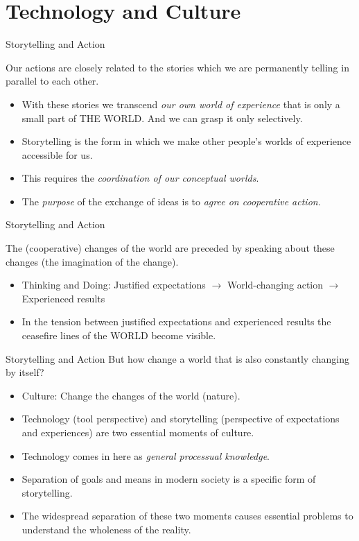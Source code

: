 \documentclass{beamer}
\title{Modelling Sustainable Systems\\ and Semantic Web\\[6pt] Information and
  Language \vskip1em}
\subtitle{Lecture in the Module 10-202-2309\\ for Master Computer Science}
\author{Prof. Dr. Hans-Gert Gräbe\\
\url{http://www.informatik.uni-leipzig.de/~graebe}}
\date{July 2021}
\begin{document}
{
\begin{frame}
  \titlepage
\end{frame}}

\section{Technology and Culture}
\begin{frame}{Storytelling and Action}
  
Our actions are closely related to the stories which we are permanently
telling in parallel to each other.
\begin{itemize}
\item With these stories we transcend \emph{our own world of experience} that
  is only a small part of THE WORLD. And we can grasp it only selectively.
\item Storytelling is the form in which we make other people's worlds of
  experience accessible for us.
\item This requires the \emph{coordination of our conceptual worlds}.
\item The \emph{purpose} of the exchange of ideas is to \emph{agree on
  cooperative action}.
\end{itemize}
\end{frame}
\begin{frame}{Storytelling and Action}

The (cooperative) changes of the world are preceded by speaking about these
changes (the imagination of the change).
\begin{itemize}
\item Thinking and Doing: Justified expectations $\to$ World-changing action
  $\to$ Experienced results
\item In the tension between justified expectations and experienced results
  the ceasefire lines of the WORLD become visible.
\end{itemize}
\end{frame}

\begin{frame}{Storytelling and Action}
But how change a world that is also constantly changing by itself?
\begin{itemize}
\item Culture: Change the changes of the world (nature).
\item Technology (tool perspective) and storytelling (perspective of
  expectations and experiences) are two essential moments of culture.
\item Technology comes in here as \emph{general processual knowledge}. 
\item Separation of goals and means in modern society is a specific form of
  storytelling.
\item The widespread separation of these two moments causes essential problems
  to understand the wholeness of the reality.
\end{itemize}
\end{frame}
\end{document}
